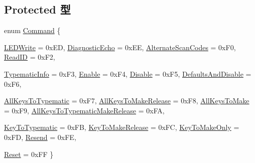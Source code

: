 \subsection*{Protected 型}
\begin{DoxyCompactItemize}
\item 
enum \hyperlink{classX86ISA_1_1PS2Keyboard_a2afce0a47a93eee73a314d53e4890153}{Command} \{ \par
\hyperlink{classX86ISA_1_1PS2Keyboard_a2afce0a47a93eee73a314d53e4890153ad6dc91d2413e9f2cdf89ad871a93031c}{LEDWrite} =  0xED, 
\hyperlink{classX86ISA_1_1PS2Keyboard_a2afce0a47a93eee73a314d53e4890153a423a0a8ae28f19327df4c132d2d7d195}{DiagnosticEcho} =  0xEE, 
\hyperlink{classX86ISA_1_1PS2Keyboard_a2afce0a47a93eee73a314d53e4890153a90d5c9255a1d8ccd1d6d6308ed498b4c}{AlternateScanCodes} =  0xF0, 
\hyperlink{classX86ISA_1_1PS2Keyboard_a2afce0a47a93eee73a314d53e4890153af2dc99b912a4b0eda5322902128c8695}{ReadID} =  0xF2, 
\par
\hyperlink{classX86ISA_1_1PS2Keyboard_a2afce0a47a93eee73a314d53e4890153a2fde6a8a26839238b4bfc635450b51f9}{TypematicInfo} =  0xF3, 
\hyperlink{classX86ISA_1_1PS2Keyboard_a2afce0a47a93eee73a314d53e4890153a80cb2080e90221d1f5b425387d9bd030}{Enable} =  0xF4, 
\hyperlink{classX86ISA_1_1PS2Keyboard_a2afce0a47a93eee73a314d53e4890153a9f306dd8981a103d6827f8b4e80da8aa}{Disable} =  0xF5, 
\hyperlink{classX86ISA_1_1PS2Keyboard_a2afce0a47a93eee73a314d53e4890153a98019ed7a55373ba59012493c7b79851}{DefaultsAndDisable} =  0xF6, 
\par
\hyperlink{classX86ISA_1_1PS2Keyboard_a2afce0a47a93eee73a314d53e4890153a6ae200ec07f334faf280cc06917a65f3}{AllKeysToTypematic} =  0xF7, 
\hyperlink{classX86ISA_1_1PS2Keyboard_a2afce0a47a93eee73a314d53e4890153a5e3e81955e4297c90c49977f1de5b792}{AllKeysToMakeRelease} =  0xF8, 
\hyperlink{classX86ISA_1_1PS2Keyboard_a2afce0a47a93eee73a314d53e4890153add98083e3a887cee194a567450d1d52c}{AllKeysToMake} =  0xF9, 
\hyperlink{classX86ISA_1_1PS2Keyboard_a2afce0a47a93eee73a314d53e4890153a3340b2b67728800eb25ee28b3d510953}{AllKeysToTypematicMakeRelease} =  0xFA, 
\par
\hyperlink{classX86ISA_1_1PS2Keyboard_a2afce0a47a93eee73a314d53e4890153a2f2757f401e96d614ca6ccf1a96af4f3}{KeyToTypematic} =  0xFB, 
\hyperlink{classX86ISA_1_1PS2Keyboard_a2afce0a47a93eee73a314d53e4890153a9e2d3c230fffc303926c29a019170532}{KeyToMakeRelease} =  0xFC, 
\hyperlink{classX86ISA_1_1PS2Keyboard_a2afce0a47a93eee73a314d53e4890153a4fdf61786633aab4eed245badad8bb6c}{KeyToMakeOnly} =  0xFD, 
\hyperlink{classX86ISA_1_1PS2Keyboard_a2afce0a47a93eee73a314d53e4890153a09faf5069efc511c8f45196604b91ee9}{Resend} =  0xFE, 
\par
\hyperlink{classX86ISA_1_1PS2Keyboard_a2afce0a47a93eee73a314d53e4890153a92793663441ced378f4676b8a6524385}{Reset} =  0xFF
 \}
\end{DoxyCompactItemize}
